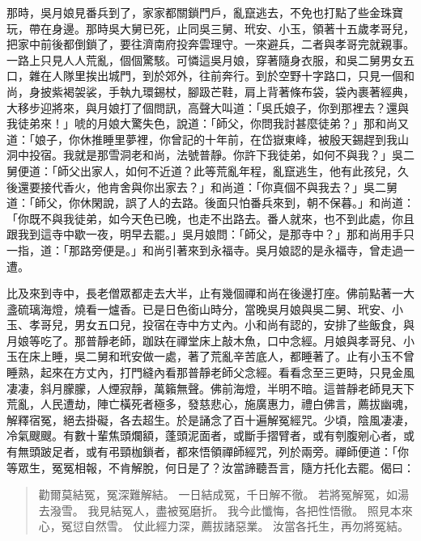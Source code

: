 那時，吳月娘見番兵到了，家家都關鎖門戶，亂竄逃去，不免也打點了些金珠寶玩，帶在身邊。那時吳大舅已死，止同吳三舅、玳安、小玉，領著十五歲孝哥兒，把家中前後都倒鎖了，要往濟南府投奔雲理守。一來避兵，二者與孝哥完就親事。一路上只見人人荒亂，個個驚駭。可憐這吳月娘，穿著隨身衣服，和吳二舅男女五口，雜在人隊里挨出城門，到於郊外，往前奔行。到於空野十字路口，只見一個和尚，身披紫褐袈裟，手執九環錫杖，腳趿芒鞋，肩上背著條布袋，袋內裹著經典，大移步迎將來，與月娘打了個問訊，高聲大叫道：「吳氏娘子，你到那裡去？還與我徒弟來！」唬的月娘大驚失色，說道：「師父，你問我討甚麼徒弟？」那和尚又道：「娘子，你休推睡里夢裡，你曾記的十年前，在岱嶽東峰，被殷天錫趕到我山洞中投宿。我就是那雪洞老和尚，法號普靜。你許下我徒弟，如何不與我？」吳二舅便道：「師父出家人，如何不近道？此等荒亂年程，亂竄逃生，他有此孩兒，久後還要接代香火，他肯舍與你出家去？」和尚道：「你真個不與我去？」吳二舅道：「師父，你休閑說，誤了人的去路。後面只怕番兵來到，朝不保暮。」和尚道：「你既不與我徒弟，如今天色已晚，也走不出路去。番人就來，也不到此處，你且跟我到這寺中歇一夜，明早去罷。」吳月娘問：「師父，是那寺中？」那和尚用手只一指，道：「那路旁便是。」和尚引著來到永福寺。吳月娘認的是永福寺，曾走過一遭。

比及來到寺中，長老僧眾都走去大半，止有幾個禪和尚在後邊打座。佛前點著一大盞硫璃海燈，燒看一爐香。已是日色銜山時分，當晚吳月娘與吳二舅、玳安、小玉、孝哥兒，男女五口兒，投宿在寺中方丈內。小和尚有認的，安排了些飯食，與月娘等吃了。那普靜老師，跏趺在禪堂床上敲木魚，口中念經。月娘與孝哥兒、小玉在床上睡，吳二舅和玳安做一處，著了荒亂辛苦底人，都睡著了。止有小玉不曾睡熟，起來在方丈內，打門縫內看那普靜老師父念經。看看念至三更時，只見金風凄凄，斜月朦朦，人煙寂靜，萬籟無聲。佛前海燈，半明不暗。這普靜老師見天下荒亂，人民遭劫，陣亡橫死者極多，發慈悲心，施廣惠力，禮白佛言，薦拔幽魂，解釋宿冤，絕去掛礙，各去超生。於是誦念了百十遍解冤經咒。少頃，陰風凄凄，冷氣颼颼。有數十輩焦頭爛額，蓬頭泥面者，或斷手摺臂者，或有刳腹剜心者，或有無頭跛足者，或有弔頸枷鎖者，都來悟領禪師經咒，列於兩旁。禪師便道：「你等眾生，冤冤相報，不肯解脫，何日是了？汝當諦聽吾言，隨方托化去罷。偈曰：
\begin{quote}
勸爾莫結冤，冤深難解結。
一日結成冤，千日解不徹。
若將冤解冤，如湯去潑雪。
我見結冤人，盡被冤磨折。
我今此懺悔，各把性悟徹。
照見本來心，冤愆自然雪。
仗此經力深，薦拔諸惡業。
汝當各托生，再勿將冤結。
\end{quote}

